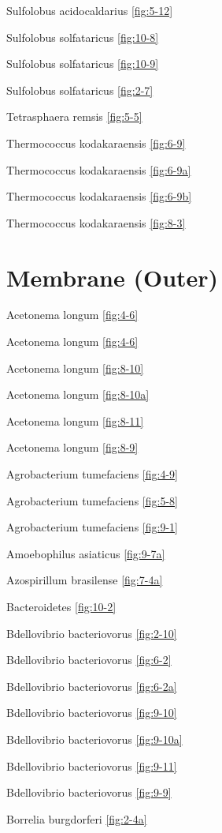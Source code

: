 \documentclass[]{tufte-book}
\begin{document}
Sulfolobus acidocaldarius \ref{fig:5-12}

Sulfolobus solfataricus \ref{fig:10-8}

Sulfolobus solfataricus \ref{fig:10-9}

Sulfolobus solfataricus \ref{fig:2-7}

Tetrasphaera remsis \ref{fig:5-5}

Thermococcus kodakaraensis \ref{fig:6-9}

Thermococcus kodakaraensis \ref{fig:6-9a}

Thermococcus kodakaraensis \ref{fig:6-9b}

Thermococcus kodakaraensis \ref{fig:8-3}

\hypertarget{membrane-outer}{%
\section*{Membrane (Outer)}\label{membrane-outer}}

Acetonema longum \ref{fig:4-6}

Acetonema longum \ref{fig:4-6}

Acetonema longum \ref{fig:8-10}

Acetonema longum \ref{fig:8-10a}

Acetonema longum \ref{fig:8-11}

Acetonema longum \ref{fig:8-9}

Agrobacterium tumefaciens \ref{fig:4-9}

Agrobacterium tumefaciens \ref{fig:5-8}

Agrobacterium tumefaciens \ref{fig:9-1}

Amoebophilus asiaticus \ref{fig:9-7a}

Azospirillum brasilense \ref{fig:7-4a}

Bacteroidetes \ref{fig:10-2}

Bdellovibrio bacteriovorus \ref{fig:2-10}

Bdellovibrio bacteriovorus \ref{fig:6-2}

Bdellovibrio bacteriovorus \ref{fig:6-2a}

Bdellovibrio bacteriovorus \ref{fig:9-10}

Bdellovibrio bacteriovorus \ref{fig:9-10a}

Bdellovibrio bacteriovorus \ref{fig:9-11}

Bdellovibrio bacteriovorus \ref{fig:9-9}

Borrelia burgdorferi \ref{fig:2-4a}
\end{document}
